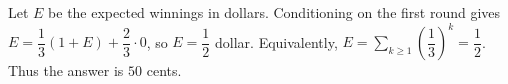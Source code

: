 Let $E$ be the expected winnings in dollars. Conditioning on the first round gives $E=\dfrac{1}{3}(1+E)+\dfrac{2}{3}\cdot0$, so $E=\dfrac{1}{2}$ dollar. Equivalently, $E=\sum_{k\ge1}(\dfrac{1}{3})^k=\dfrac{1}{2}$. Thus the answer is $\boxed{50}$ cents.
